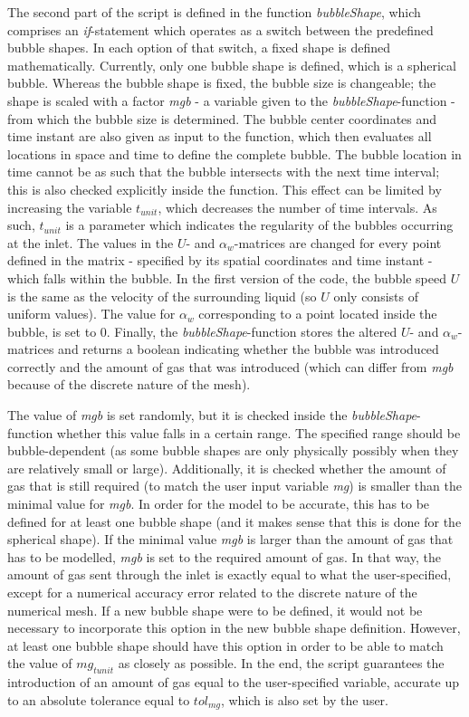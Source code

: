 \documentclass[fleqn,10pt,a4paper,twoside,english]{book}
\begin{document}
\par The second part of the script is defined in the function \textit{bubbleShape}, which comprises an \textit{if}-statement which operates as a switch between the predefined bubble shapes. In each option of that switch, a fixed shape is defined mathematically. Currently, only one bubble shape is defined, which is a spherical bubble. Whereas the bubble shape is fixed, the bubble size is changeable; the shape is scaled with a factor \textit{mgb} - a variable given to the \textit{bubbleShape}-function - from which the bubble size is determined. The bubble center coordinates and time instant are also given as input to the function, which then evaluates all locations in space and time to define the complete bubble. The bubble location in time cannot be as such that the bubble intersects with the next time interval; this is also checked explicitly inside the function. This effect can be limited by increasing the variable $t_{unit}$, which decreases the number of time intervals. As such, $t_{unit}$ is a parameter which indicates the regularity of the bubbles occurring at the inlet.   The values in the $U$- and $\alpha_w$-matrices are changed for every point defined in the matrix - specified by its spatial coordinates and time instant - which falls within the bubble. In the first version of the code, the bubble speed $U$ is the same as the velocity of the surrounding liquid (so $U$ only consists of uniform values). The value for $\alpha_{w}$ corresponding to a point located inside the bubble, is set to 0. Finally, the \textit{bubbleShape}-function stores the altered $U$- and $\alpha_{w}$-matrices and returns a boolean indicating whether the bubble was introduced correctly and the amount of gas that was introduced (which can differ from \textit{mgb} because of the discrete nature of the mesh).
\par The value of \textit{mgb} is set randomly, but it is checked inside the \textit{bubbleShape}-function whether this value falls in a certain range. The specified range should be bubble-dependent (as some bubble shapes are only physically possibly when they are relatively small or large). Additionally, it is checked whether the amount of gas that is still required (to match the user input variable \textit{mg}) is smaller than the minimal value for \textit{mgb}. In order for the model to be accurate, this has to be defined for at least one bubble shape (and it makes sense that this is done for the spherical shape). If the minimal value \textit{mgb} is larger than the amount of gas that has to be modelled, \textit{mgb} is set to the required amount of gas. In that way, the amount of gas sent through the inlet is exactly equal to what the user-specified, except for a numerical accuracy error related to the discrete nature of the numerical mesh. If a new bubble shape were to be defined, it would not be necessary to incorporate this option in the new bubble shape definition. However, at least one bubble shape should have this option in order to be able to match the value of $mg_{tunit}$ as closely as possible. In the end, the script guarantees the introduction of an amount of gas equal to the user-specified variable, accurate up to an absolute tolerance equal to $tol_{mg}$, which is also set by the user.
\end{document}
